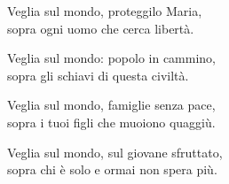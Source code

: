 
\strofa Veglia sul mondo, proteggilo Maria,\\
sopra ogni uomo che cerca libertà.

\spazio


\spazio

\strofa Veglia sul mondo: popolo in cammino,\\
sopra gli schiavi di questa civiltà.

\spazio


\spazio

\strofa Veglia sul mondo, famiglie senza pace,\\
sopra i tuoi figli che muoiono quaggiù.

\spazio


\spazio

\strofa Veglia sul mondo, sul giovane sfruttato,\\
sopra chi è solo e ormai non spera più.

\spazio


